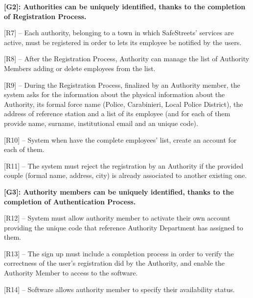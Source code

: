 \documentclass[12pt]{article}
\begin{document}
\vspace{4mm}
\textbf{[G2]: Authorities can be uniquely identified, thanks to the completion of Registration Process.}
\vspace{2mm}
\begin{flushleft}


[R7] -- Each authority, belonging to a town in which SafeStreets’ services are active, must be registered in order to lets its employee be notified by the users.
\vspace{2mm}

[R8] – After the Registration Process, Authority can manage the list of Authority Members adding or delete employees from the list.
\vspace{2mm}

[R9] – During the Registration Process, finalized by an Authority member, the system asks for the information about the physical information about the Authority, its formal force name (Police, Carabinieri, Local Police District), the address of reference station and a list of its employee (and for each of them provide name, surname, institutional email and an unique code).
\vspace{2mm}

[R10] – System when have the complete employees’ list, create an account for each of them.
\vspace{2mm}

[R11] – The system must reject the registration by an Authority if the provided couple (formal name, address, city) is already associated to another existing one.
\vspace{2mm}


\vspace{4mm}
\textbf{[G3]: Authority members can be uniquely identified, thanks to the completion of Authentication Process.}
\vspace{2mm}

[R12] -- System must allow authority member to activate their own account providing the unique code that reference Authority Department has assigned to them.
\vspace{2mm}

[R13] – The sign up must include a completion process in order to verify the correctness of the user’s registration did by the Authority, and enable the Authority Member to access to the software.
\vspace{2mm}

[R14] – Software allows authority member to specify their availability status.
\vspace{2mm}


\end{flushleft}
\end{document}
